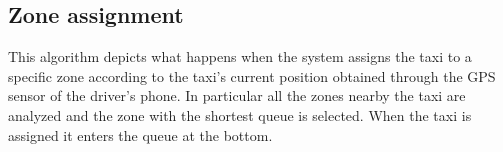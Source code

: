 \documentclass[a4paper,11pt]{report} %
\begin{document}
\begin{minipage}{\linewidth}
	\end{minipage}
	
	\pagebreak
	
	\subsection{Zone assignment}
	This algorithm depicts what happens when the system assigns the taxi to a specific zone according to the taxi's current position obtained through the GPS sensor of the driver's phone. In particular all the zones nearby the taxi are analyzed and the zone with the shortest queue is selected. When the taxi is assigned it enters the queue at the bottom.\\
	
	\begin{minipage}{\linewidth}
		\makebox[\linewidth]{
}
\end{minipage}
\end{document}
